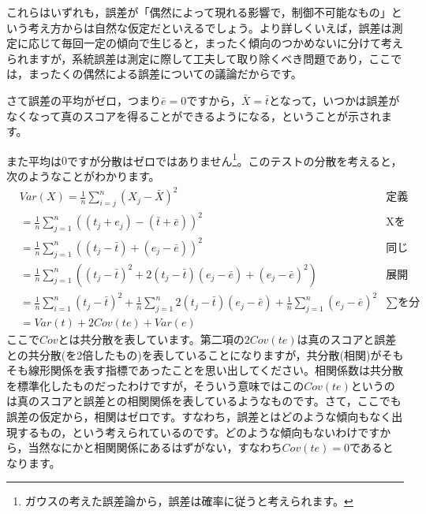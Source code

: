 \documentclass{ltjsbook}
\begin{document}
これらはいずれも，誤差が「偶然によって現れる影響で，制御不可能なもの」という考え方からは自然な仮定だといえるでしょう。より詳しくいえば，誤差は測定に応じて毎回一定の傾向で生じると，まったく傾向のつかめないに分けて考えられますが，系統誤差は測定に際して工夫して取り除くべき問題であり，ここでは，まったくの偶然による誤差についての議論だからです。

さて誤差の平均がゼロ，つまり$\bar{e}=0$ですから，$\bar{X}=\bar{t}$となって，いつかは誤差がなくなって真のスコアを得ることができるようになる，ということが示されます。

また平均は$0$ですが分散はゼロではありません\footnote{ガウスの考えた誤差論から，誤差は確率に従うと考えられます。}。このテストの分散を考えると，次のようなことがわかります。
\begin{align*}
	 & Var(X)  =  \frac{1}{n}\sum_{i=j}^n (X_j - \bar{X})^2                                                                                              & \mbox{定義より}         \\
	 & = \frac{1}{n}\sum_{j=1}^n  ((t_j + e_j) - (\bar{t} + \bar{e}))^2                                                                                  & \mbox{Xをテスト理論のモデルに} \\
	 & = \frac{1}{n}\sum_{j=1}^n (  (t_j - \bar{t}) + (e_j - \bar{e}) )^2                                                                                & \mbox{同じ記号でまとめる}    \\
	 & = \frac{1}{n}\sum_{j=1}^n (  (t_j - \bar{t})^2 + 2(t_j - \bar{t})(e_j - \bar{e}) + (e_j - \bar{e})^2  )                                           & \mbox{展開する}         \\
	 & = \frac{1}{n}\sum_{i=1}^n (t_j - \bar{t})^2 +\frac{1}{n}\sum_{j=1}^n 2(t_j - \bar{t})(e_j - \bar{e})  + \frac{1}{n}\sum_{j=1}^n (e_j - \bar{e})^2 & \mbox{$\sum$を分配}    \\
	 & =  Var(t) + 2Cov(te) + Var(e)
\end{align*}
ここで$Cov$とは共分散を表しています。第二項の$2Cov(te)$は真のスコアと誤差との共分散(を2倍したもの)を表していることになりますが，共分散(相関)がそもそも線形関係を表す指標であったことを思い出してください。相関係数は共分散を標準化したものだったわけですが，そういう意味ではこの$Cov(te)$というのは真のスコアと誤差との相関関係を表しているようなものです。さて，ここでも誤差の仮定から，相関はゼロです。すなわち，誤差とはどのような傾向もなく出現するもの，という考えられているのです。どのような傾向もないわけですから，当然なにかと相関関係にあるはずがない，すなわち$Cov(te)=0$であるとなります。
\end{document}
